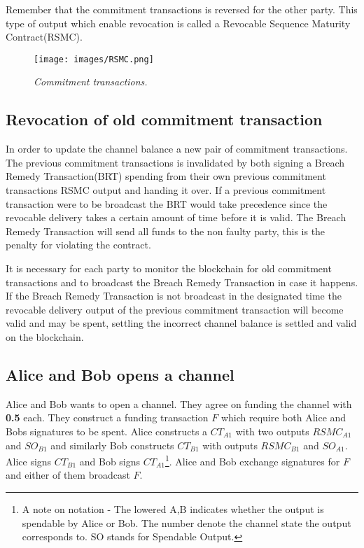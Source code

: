 Remember that the commitment transactions is reversed for the other party. This type of output which enable revocation is called a Revocable Sequence Maturity Contract(RSMC).

\begin{figure}[!htb]
			\hspace*{-0.8cm} 
	\centering
	\texttt{[image: images/RSMC.png]}
	\caption{\textit{Commitment transactions. 
	}}
	\label{fig:merkle:tree}
			\hspace*{2mm} 
\end{figure}

\subsection{Revocation of old commitment transaction}

In order to update the channel balance a new pair of commitment transactions. The previous commitment transactions is invalidated by both signing a Breach Remedy Transaction(BRT) spending from their own previous commitment transactions RSMC output and handing it over. If a previous commitment transaction were to be broadcast the BRT would take precedence since the revocable delivery takes a certain amount of time before it is valid. The Breach Remedy Transaction will send all funds to the non faulty party, this is the penalty for violating the contract.

It is necessary for each party to monitor the blockchain for old commitment transactions and to broadcast the Breach Remedy Transaction in case it happens. If the Breach Remedy Transaction is not broadcast in the designated time the revocable delivery output of the previous commitment transaction will become valid and may be spent, settling the incorrect channel balance is settled and valid on the blockchain.

\subsection{Alice and Bob opens a channel}

Alice and Bob wants to open a channel. They agree on funding the channel with \textbf{0.5\bitcoin} each. They construct a funding transaction $F$ which require both Alice and Bobs signatures to be spent. Alice constructs a $CT_{A1}$ with two outputs $RSMC_{A1}$ and $SO_{B1}$ and similarly Bob constructs $CT_{B1}$ with outputs $RSMC_{B1}$ and $SO_{A1}$. Alice signs $CT_{B1}$ and Bob signs $CT_{A1}$\footnote{A note on notation - The lowered A,B indicates whether the output is spendable by Alice or Bob. The number denote the channel state the output corresponds to. SO stands for Spendable Output.}. Alice and Bob exchange signatures for $F$ and either of them broadcast $F$.

